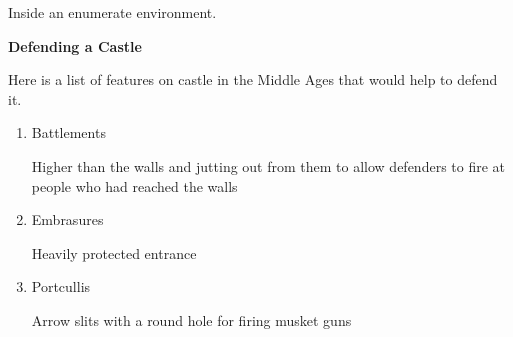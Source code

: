 \documentclass{article}
\begin{document}
{Inside an enumerate environment. }


\textbf{\Large{}Defending a Castle}

\noindent
Here is a list of features on castle in the Middle Ages that would help to defend it.

\begin{enumerate}
\item Battlements

\begin{clozepar}
Higher than the walls and jutting out from them to allow
defenders to fire at people who had reached the walls
\end{clozepar}

\item Embrasures

\begin{clozepar}
Heavily protected entrance
\end{clozepar}

\item Portcullis

\begin{clozepar}
Arrow slits with a round hole for firing musket guns
\end{clozepar}
\end{enumerate}
\end{document}
